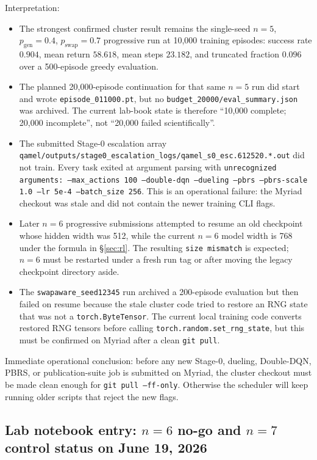 \documentclass[11pt]{article}
\newcommand{\code}[1]{\texttt{#1}}
\newcommand{\file}[1]{\texttt{\small #1}}
\newcommand{\pgen}{p_{\text{gen}}}
\newcommand{\pswap}{p_{\text{swap}}}
\begin{document}
Interpretation:
\begin{itemize}
  \item The strongest confirmed cluster result remains the single-seed $n=5$,
  $\pgen=0.4$, $\pswap=0.7$ progressive run at 10{,}000 training episodes:
  success rate $0.904$, mean return $58.618$, mean steps $23.182$, and
  truncated fraction $0.096$ over a 500-episode greedy evaluation.
  \item The planned 20{,}000-episode continuation for that same $n=5$ run did
  start and wrote \file{episode\_011000.pt}, but no
  \file{budget\_20000/eval\_summary.json} was archived. The current lab-book
  state is therefore ``10{,}000 complete; 20{,}000 incomplete'', not ``20{,}000
  failed scientifically''.
  \item The submitted Stage-0 escalation array
  \file{qamel/outputs/stage0\_escalation\_logs/qamel\_s0\_esc.612520.*.out}
  did not train. Every task exited at argument parsing with
  \code{unrecognized arguments: --max\_actions 100 --double-dqn --dueling --pbrs
  --pbrs-scale 1.0 --lr 5e-4 --batch\_size 256}. This is an operational
  failure: the Myriad checkout was stale and did not contain the newer training
  CLI flags.
  \item Later $n=6$ progressive submissions attempted to resume an old
  checkpoint whose hidden width was 512, while the current $n=6$ model width is
  768 under the formula in \S\ref{sec:rl}. The resulting
  \code{size mismatch} is expected; $n=6$ must be restarted under a fresh run tag
  or after moving the legacy checkpoint directory aside.
  \item The \code{swapaware\_seed12345} run archived a 200-episode evaluation but
  then failed on resume because the stale cluster code tried to restore an RNG
  state that was not a \code{torch.ByteTensor}. The current local training code
  converts restored RNG tensors before calling \code{torch.random.set\_rng\_state},
  but this must be confirmed on Myriad after a clean \code{git pull}.
\end{itemize}

Immediate operational conclusion: before any new Stage-0, dueling, Double-DQN,
PBRS, or publication-suite job is submitted on Myriad, the cluster checkout must
be made clean enough for \code{git pull --ff-only}. Otherwise the scheduler will
keep running older scripts that reject the new flags.

\subsection{Lab notebook entry: $n=6$ no-go and $n=7$ control status on June 19, 2026}
\label{sec:lablog-2026-06-19-n6-n7}
\end{document}
